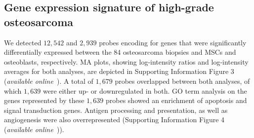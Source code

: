 \subsection{Gene expression signature of high\hyp{}grade osteosarcoma}
We detected $12,542$ and $2,939$ probes encoding
for genes that were significantly differentially
expressed between the 84 osteosarcoma biopsies
and MSCs and osteoblasts, respectively. MA
plots, showing log\hyp{}intensity ratios and log\hyp{}intensity
averages for both analyses, are depicted in
Supporting Information Figure 3 ({\it available online}~\cite{ch7additional}). A total of $1,679$
probes overlapped between both analyses, of
which $1,639$ were either up- or downregulated in
both. GO term analysis on the genes represented
by these $1,639$ probes showed an enrichment of
apoptosis and signal transduction genes. Antigen
processing and presentation, as well as angiogenesis
were also overrepresented (Supporting Information
Figure 4 ({\it available online}~\cite{ch7additional})).

